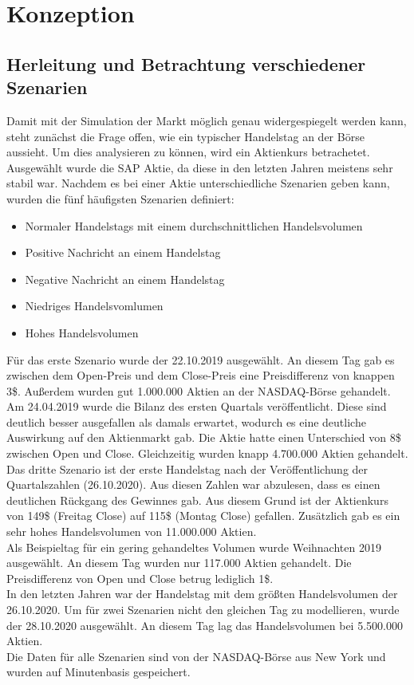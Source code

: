 \chapter{Konzeption}
\section{Herleitung und Betrachtung verschiedener Szenarien}\label{sec:szenarien}
Damit mit der Simulation der Markt möglich genau widergespiegelt werden kann, steht zunächst die Frage offen,
wie ein typischer Handelstag an der Börse aussieht. Um dies analysieren zu können, wird ein Aktienkurs betrachetet.
Ausgewählt wurde die SAP Aktie, da diese in den letzten Jahren meistens sehr stabil war. Nachdem es bei einer Aktie unterschiedliche Szenarien geben kann, 
wurden die fünf häufigsten Szenarien definiert:
\begin{itemize}
    \item Normaler Handelstags mit einem durchschnittlichen Handelsvolumen
    \item Positive Nachricht an einem Handelstag
    \item Negative Nachricht an einem Handelstag
    \item Niedriges Handelsvomlumen 
    \item Hohes Handelsvolumen
\end{itemize}
Für das erste Szenario wurde der 22.10.2019 ausgewählt. An diesem Tag gab es
zwischen dem Open-Preis und dem Close-Preis eine Preisdifferenz von knappen 3\$. Außerdem wurden gut 1.000.000 Aktien an der NASDAQ-Börse gehandelt. \\
Am 24.04.2019 wurde die Bilanz des ersten Quartals veröffentlicht. Diese sind deutlich besser ausgefallen als damals erwartet, wodurch es eine deutliche Auswirkung auf den Aktienmarkt gab. Die Aktie hatte einen Unterschied von 8\$ zwischen 
Open und Close. Gleichzeitig wurden knapp 4.700.000 Aktien gehandelt. \\
Das dritte Szenario ist der erste Handelstag nach der Veröffentlichung der Quartalszahlen (26.10.2020). Aus diesen Zahlen war 
abzulesen, dass es einen deutlichen Rückgang des Gewinnes gab.
Aus diesem Grund ist der Aktienkurs von 149\$ (Freitag Close) 
auf 115\$ (Montag Close) gefallen. Zusätzlich gab es ein sehr hohes Handelsvolumen von 11.000.000 Aktien. \\
Als Beispieltag für ein gering gehandeltes Volumen wurde Weihnachten 2019 ausgewählt. An diesem Tag wurden nur 117.000 Aktien gehandelt. Die Preisdifferenz von Open und Close betrug lediglich 1\$. \\
In den letzten Jahren war der Handelstag mit dem größten Handelsvolumen der 26.10.2020. Um für zwei Szenarien nicht den gleichen 
Tag zu modellieren, wurde der 28.10.2020 ausgewählt. An diesem Tag lag das Handelsvolumen bei 5.500.000 Aktien. \\
Die Daten für alle Szenarien sind von der NASDAQ-Börse aus New York und wurden auf Minutenbasis gespeichert.


